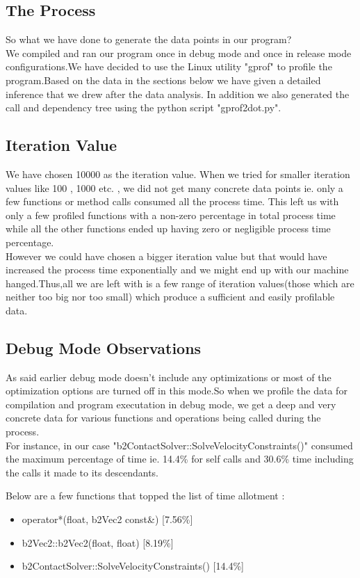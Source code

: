 \documentclass[11pt]{article}
\begin{document}
\subsection{The Process}
So what we have done to generate the data points in our program?\\
We compiled and ran our program once in debug mode and once in release mode configurations.We have decided to use the Linux utility "gprof" to profile the program.Based on the data in the sections below we have given a detailed inference that we drew after the data analysis. In addition we also generated the call and dependency tree using the python script "gprof2dot.py".


\subsection{Iteration Value}
We have chosen 10000 as the iteration value. When we tried for smaller iteration values like 100 , 1000 etc. , we did not get many concrete data points ie. only a few functions or method calls consumed all the process time. This left us with only a few profiled functions with a non-zero percentage in total process time while all the other functions ended up having zero or negligible process time percentage. \\
However we could have chosen a bigger iteration value but that would have increased the process time exponentially and we might end up with our machine hanged.Thus,all we are left with is a few range of iteration values(those which are neither too big nor too small) which produce a sufficient and easily profilable data.


\subsection{Debug Mode Observations}
As said earlier debug mode doesn't include any optimizations or most of the optimization options are turned off in this mode.So when we profile the data for compilation and program executation in debug mode,  we get a deep and very concrete data for various functions and operations being called during the process.\\

For instance, in our case "b2ContactSolver::SolveVelocityConstraints()" consumed the maximum percentage of time ie. 14.4\% for self calls and 30.6\% time including the calls it made to its descendants.

Below are a few functions that topped the list of time allotment :
\begin{itemize}
\item operator*(float, b2Vec2 const\&) [7.56\%]
\item b2Vec2::b2Vec2(float, float) [8.19\%]
\item b2ContactSolver::SolveVelocityConstraints() [14.4\%]
\end{itemize}
\end{document}
